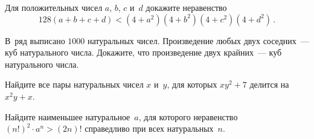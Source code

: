 \begin{problems}
\item
Для положительных чисел $a$, $b$, $c$ и~$d$ докажите неравенство
\[
    128 (a + b + c + d)
<
    (4 + a^2) (4 + b^2) (4 + c^2) (4 + d^2)
\, . \]


\item
В~ряд выписано $1000$ натуральных чисел.
Произведение любых двух соседних~--- куб натурального числа.
Докажите, что произведение двух крайних~--- куб натурального числа.


\item
Найдите все пары натуральных чисел $x$ и~$y$, для которых $x y^2 + 7$ делится
на~$x^2 y + x$.


\item
Найдите наименьшее натуральное~$a$, для которого неравенство
$(n!)^2 \cdot a^n > (2 n)!$ справедливо при всех натуральных~$n$.


\end{problems}

